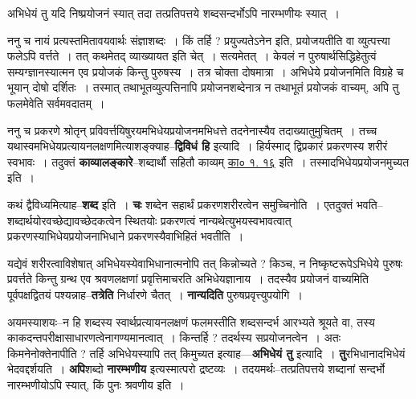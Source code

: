 \documentclass[article,12pt,a4paper]{memoir}
\begin{document}
	  \pstart {}अभिधेयं तु यदि निष्प्रयोजनं स्यात् तदा तत्प्रतिपत्तये शब्दसन्दर्भोऽपि नारम्भणीयः स्यात् ।
	\pend
      
	  \endgroup
	

	  \pstart ननु च नायं प्रत्यस्तमितावयवार्थः संज्ञाशब्दः । किं तर्हि ? प्रयुज्यतेऽनेन इति, प्रयोजयतीति वा व्युत्पत्त्या फलेऽपि वर्त्तते । तत् कथमेतद् व्याख्यायत इति चेत् । सत्यमेतत् । केवलं न पुरुषार्थसिद्धिहेतुत्वं सम्यग्ज्ञानस्यात्मन एव प्रयोजकं किन्तु पुरुषस्य । तत्र चोक्ता दोषमात्रा । अभिधेये प्रयोजनमिति विग्रहे च भूयान् दोषो दर्शितः । तस्मात् तथाभूतव्युत्पत्तिनापि प्रयोजनशब्देनात्र न तथाभूतं प्रयोजकं वाच्यम्, अपि तु फलमेवेति सर्वमवदातम् ।
	\pend
      

	  \pstart ननु च प्रकरणे श्रोतृन् प्रविवर्त्तयिषुरयमभिधेयप्रयोजनमभिधत्ते तदनेनास्यैव तदाख्यातुमुचितम् । तच्च यथास्वमभिधेयप्रत्यायनलक्षणमित्याशङ्क्याह--\textbf{द्विविधं हि} इत्यादि । हिर्यस्माद् द्विप्रकारं प्रकरणस्य शरीरं स्वभावः । तदुक्तं \textbf{काव्यालङ्कारे}--शब्दार्थौ सहितौ काव्यम् \href{http://sarit.indology.info/?cref=kā.1.16}{का० १. १६} इति । तस्मादभिधेयप्रयोजनमुच्यत इति ।
	\pend
      

	  \pstart कथं द्वैविध्यमित्याह--\textbf{शब्द} इति । \textbf{चः} शब्देन सहार्थं प्रकरणशरीरत्वेन समुच्चिनोति । एतदुक्तं भवति--शब्दार्थयोरवच्छेद्यावच्छेदकत्वेन स्थितयोः प्रकरणत्वं नान्यथेत्युभयस्वभावत्वात् प्रकरणस्याभिधेयप्रयोजनाभिधाने प्रकरणस्यैवाभिहितं भवतीति ।
	\pend
      

	  \pstart यद्येवं शरीरत्वाविशेषात् अभिधेयस्येवाभिधानात्मनोपि तत् किन्नोच्यते ? किञ्च, न निष्कृष्टरूपेऽभिधेये पुरुषः प्रवर्त्तते किन्तु ग्रन्थ एव श्रवणलक्षणां प्रवृत्तिमाचरति अभिधेयज्ञानाय । तदस्यैव प्रयोजनं वाच्यमिति पूर्वपक्षद्वितयं पश्यन्नाह--\textbf{तत्रेति} निर्धा\leavevmode{}रणे चैतत् । \textbf{नान्यदिति} पुरुषप्रवृत्त्युपयोगि ।
	\pend
      

	  \pstart अयमस्याशयः--न हि शब्दस्य स्वार्थप्रत्यायनलक्षणं फलमस्तीति शब्दसन्दर्भ आरभ्यते श्रूयते वा, तस्य काकदन्तपरीक्षासाधारणत्वेनागण्यमानत्वात् । किन्तर्हि ? तदर्थस्य सप्रयोजनत्वेन । अतः किमनेनोक्तेनापीति ? तर्हि अभिधेयस्यापि तत् किमुच्यत इत्याह—\textbf{अभिधेयं तु} इत्यादि । \textbf{तु}रभिधानादभिधेयं भेदवद्दर्शयति । \textbf{अपि}शब्दो \textbf{नारम्भणीय} इत्यस्मात्परो द्रष्टव्यः । तदयमर्थः--तत्प्रतिपत्तये शब्दानां सन्दर्भो नारम्भणीयोऽपि स्यात्, किं पुनः श्रवणीय इति ।
	\pend
	  \bigskip
	  \begingroup
	
\end{document}
